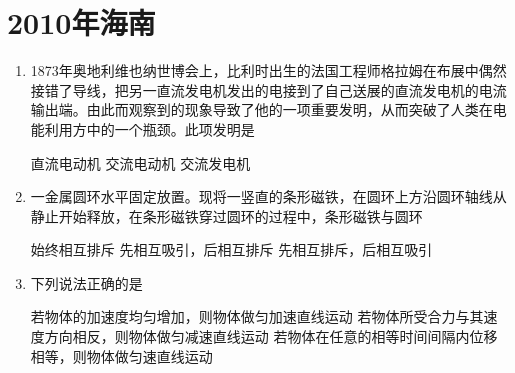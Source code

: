 \documentclass[\gkver]{gaokaozhenti}
\begin{document}
\chapter{2010年海南}

\begin{enumerate}
\item
1873年奥地利维也纳世博会上，比利时出生的法国工程师格拉姆在布展中偶然接错了导线，把另一直流发电机发出的电接到了自己送展的直流发电机的电流输出端。由此而观察到的现象导致了他的一项重要发明，从而突破了人类在电能利用方中的一个瓶颈。此项发明是

{直流电动机}
{交流电动机}
{交流发电机}


\item
一金属圆环水平固定放置。现将一竖直的条形磁铁，在圆环上方沿圆环轴线从静止开始释放，在条形磁铁穿过圆环的过程中，条形磁铁与圆环

{始终相互排斥}
{先相互吸引，后相互排斥}
{先相互排斥，后相互吸引}


\item
下列说法正确的是

{若物体的加速度均匀增加，则物体做匀加速直线运动}
{若物体所受合力与其速度方向相反，则物体做匀减速直线运动}
{若物体在任意的相等时间间隔内位移相等，则物体做匀速直线运动}



\end{enumerate}
\end{document}
